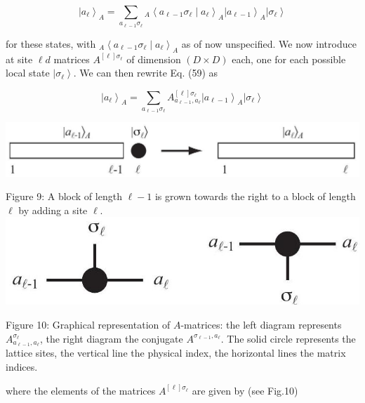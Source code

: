 \documentclass[12pt]{article}
\begin{document}
\begin{equation*}
\left|a_{\ell}\right\rangle_{A}=\sum_{a_{\ell-1} \sigma_{\ell}}{ }_{A}\left\langle a_{\ell-1} \sigma_{\ell} \mid a_{\ell}\right\rangle_{A}\left|a_{\ell-1}\right\rangle_{A}\left|\sigma_{\ell}\right\rangle \tag{59}
\end{equation*}


for these states, with ${ }_{A}\left\langle a_{\ell-1} \sigma_{\ell} \mid a_{\ell}\right\rangle_{A}$ as of now unspecified. We now introduce at site $\ell d$ matrices $A^{[\ell] \sigma_{\ell}}$ of dimension $(D \times D)$ each, one for each possible local state $\left|\sigma_{\ell}\right\rangle$. We can then rewrite Eq. (59) as


\begin{equation*}
\left|a_{\ell}\right\rangle_{A}=\sum_{a_{\ell-1} \sigma_{\ell}} A_{a_{\ell-1}, a_{\ell}}^{[\ell] \sigma_{\ell}}\left|a_{\ell-1}\right\rangle_{A}\left|\sigma_{\ell}\right\rangle \tag{60}
\end{equation*}


\begin{center}
\includegraphics[max width=\textwidth]{2024_05_04_afc4ad226da9ccfe0ac8g-026(1)}
\end{center}

Figure 9: A block of length $\ell-1$ is grown towards the right to a block of length $\ell$ by adding a site $\ell$.\\
\includegraphics[max width=\textwidth, center]{2024_05_04_afc4ad226da9ccfe0ac8g-026}

Figure 10: Graphical representation of $A$-matrices: the left diagram represents $A_{a_{\ell-1}, a_{\ell}}^{\sigma_{\ell}}$, the right diagram the conjugate $A^{\sigma_{\ell-1}, a_{\ell}}$. The solid circle represents the lattice sites, the vertical line the physical index, the horizontal lines the matrix indices.

where the elements of the matrices $A^{[\ell] \sigma_{\ell}}$ are given by (see Fig.10)
\end{document}
